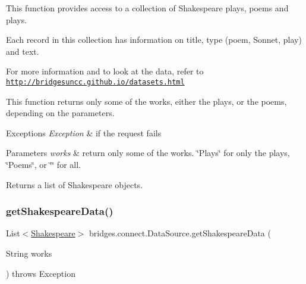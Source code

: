 This function provides access to a collection of Shakespeare plays, poems and plays. 

Each record in this collection has information on title, type (poem, Sonnet, play) and text.

For more information and to look at the data, refer to \href{http://bridgesuncc.github.io/datasets.html}{\tt http\+://bridgesuncc.\+github.\+io/datasets.\+html}

This function returns only some of the works, either the plays, or the poems, depending on the parameters.


\begin{DoxyExceptions}{Exceptions}
{\em Exception} & if the request fails\\
\hline
\end{DoxyExceptions}

\begin{DoxyParams}{Parameters}
{\em works} & return only some of the works. \char`\"{}\+Plays\char`\"{} for only the plays, \char`\"{}\+Poems\char`\"{}, or \char`\"{}\char`\"{} for all.\\
\hline
\end{DoxyParams}
\begin{DoxyReturn}{Returns}
a list of Shakespeare objects. 
\end{DoxyReturn}
\mbox{\label{classbridges_1_1connect_1_1_data_source_a04aa757c45139e52525d4b09156abfe1}} 
\subsubsection{\texorpdfstring{get\+Shakespeare\+Data()}{getShakespeareData()}\hspace{0.1cm}{\footnotesize\ttfamily [3/3]}}
{\footnotesize\ttfamily List$<$\hyperlink{classbridges_1_1data__src__dependent_1_1_shakespeare}{Shakespeare}$>$ bridges.\+connect.\+Data\+Source.\+get\+Shakespeare\+Data (\begin{DoxyParamCaption}\item[{String}]{works }\end{DoxyParamCaption}) throws Exception}

\mbox{\label{classbridges_1_1connect_1_1_data_source_a935ea2005b7de3cb22c1e55027b81460}} 

